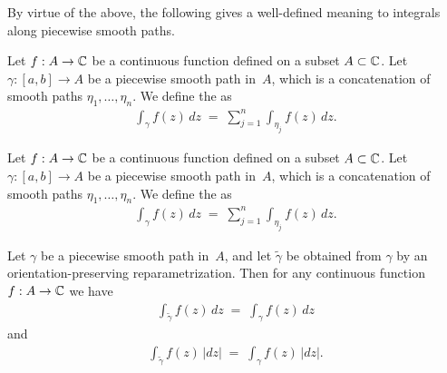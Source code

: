 By virtue of the above, the following gives a well-defined meaning
to integrals along piecewise smooth paths.
\begin{definition}
  \label{def:contour_integral}
  Let $f : A \to \mathbb{C}$ be a continuous function defined on a subset $A \subset \mathbb{C}$.
  Let $\gamma \colon [a,b] \to A$ be a piecewise smooth path in~$A$,
  which is a concatenation of smooth paths $\eta_1, \ldots, \eta_n$.
  We define the  as
  \begin{align*}
    \int_\gamma f(z) \, dz \; = \; \sum_{j=1}^n \int_{\eta_j} f(z) \, dz .
  \end{align*}
\end{definition}

\begin{definition}
  \label{def:arc_length_integral}
  Let $f : A \to \mathbb{C}$ be a continuous function defined on a subset $A \subset \mathbb{C}$.
  Let $\gamma \colon [a,b] \to A$ be a piecewise smooth path in~$A$,
  which is a concatenation of smooth paths $\eta_1, \ldots, \eta_n$.
  We define the  as
  \begin{align*}
    \int_\gamma f(z) \, dz \; = \; \sum_{j=1}^n \int_{\eta_j} f(z) \, dz .
  \end{align*}
\end{definition}

\begin{lemma}
  \label{lem:reparametrization_invariance_of_integral}
  Let $\gamma$ be a piecewise smooth path in~$A$,
  and let $\widetilde{\gamma}$ be obtained from $\gamma$ by an
  orientation-preserving reparametrization. Then for any continuous
  function $f : A \to \mathbb{C}$ we have
  \begin{align*}
    \int_{\widetilde{\gamma}} f(z) \, dz \; = \; \int_{\gamma} f(z) \, dz
  \end{align*}
  and
  \begin{align*}
    \int_{\widetilde{\gamma}} f(z) \, |dz| \; = \; \int_{\gamma} f(z) \, |dz| .
  \end{align*}
\end{lemma}

